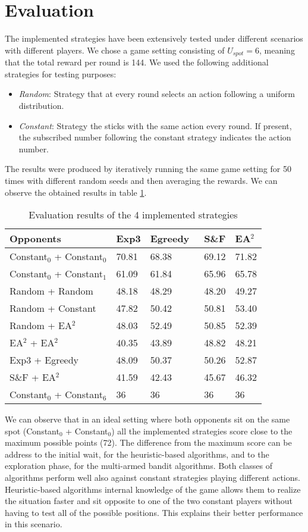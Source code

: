 \documentclass[runningheads]{llncs}
\begin{document}
\section{Evaluation}
The implemented strategies have been extensively tested under
different scenarios with different players. We chose a game setting
consisting of $U_{spot} = 6$, meaning that the total reward per round
is 144. We used the following additional strategies for testing
purposes:
\begin{itemize}
\item \textit{Random}: Strategy that at every round selects an action
following a uniform distribution.
\item \textit{Constant}: Strategy the sticks with the same action
every round. If present, the subscribed number following the constant
strategy indicates the action number.
\end{itemize}
The results were produced by iteratively running the same game setting
for 50 times with different random seeds and then averaging the
rewards. We can observe the obtained results in table \ref{result-table}.
\begin{table}[h!]
\centering
\caption{Evaluation results of the 4 implemented strategies}
\label{result-table}
\begin{tabular}{l|l|l|l|l}
Opponents       & Exp3 \; & Egreedy \, & S\&F \;\; & EA$^2$   \\
\hline
Constant$_0$ + Constant$_0$ \;& 70.81 & 68.38   & 69.12 & 71.82 \\
Constant$_0$ + Constant$_1$ & 61.09 & 61.84   & 65.96 & 65.78 \\
Random + Random  \;   & 48.18 & 48.29   & 48.20 & 49.27 \\
Random + Constant    & 47.82 & 50.42   & 50.81 & 53.40 \\
Random + EA$^2$   & 48.03 & 52.49   & 50.85 & 52.39 \\
EA$^2$ + EA$^2$ & 40.35 & 43.89  & 48.82 & 48.21 \\
Exp3 + Egreedy  & 48.09 & 50.37   & 50.26 & 52.87 \\
S\&F + EA$^2$       & 41.59 & 42.43   & 45.67 & 46.32 \\
Constant$_0$ + Constant$_6$ & 36    & 36      & 36    & 36
\end{tabular}
\end{table}

We can observe that in an ideal setting where both opponents sit on
the same spot (Constant$_0$ + Constant$_0$) all the implemented
strategies score close to the maximum possible points (72). The
difference from the maximum score can be address to the initial
wait, for the heuristic-based algorithms, and to the exploration
phase, for the multi-armed bandit algorithms. Both classes of
algorithms perform well also against constant strategies playing
different actions. Heuristic-based algorithms internal knowledge of
the game allows them to realize the situation faster and sit opposite
to one of the two constant players without having to test all of the
possible positions. This explains their better performance in this
scenario.
\end{document}
